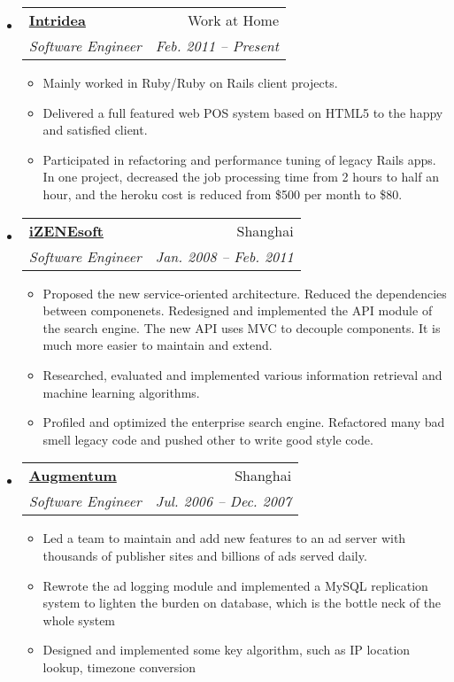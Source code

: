 \documentclass[letterpaper,11pt]{article}
\makeatletter
\newcommand{\resitem}[1]{\item #1 \vspace{-2pt}}
\newcommand{\ressubheading}[4]{
\begin{tabular*}{6.5in}{l@{\extracolsep{\fill}}r}
  \textbf{#1} & #2 \\
  \textit{#3} & \textit{#4} \\
\end{tabular*}\vspace{-6pt}}
\makeatother
\begin{document}
\begin{itemize}
\item
  \ressubheading{\href{http://www.intridea.com}{Intridea}}{Work at Home}{%
    Software Engineer}{Feb. 2011 -- Present}

  { \footnotesize
    \begin{itemize}
      \resitem{Mainly worked in Ruby/Ruby on Rails client projects.}

      \resitem{Delivered a full featured web POS system based on HTML5 to the
        happy and satisfied client.}

      \resitem{Participated in refactoring and performance tuning of legacy
        Rails apps. In one project, decreased the job processing time from 2 hours to half an hour, and the heroku cost is
        reduced from \$500 per month to \$80.}
    \end{itemize}
  }

\item
  \ressubheading{\href{http://www.izenesoft.com/EN/home.html}{iZENEsoft}}{Shanghai}{%
    Software Engineer}{Jan. 2008 -- Feb. 2011}

  { \footnotesize
    \begin{itemize}
      \resitem{Proposed the new service-oriented architecture. Reduced the
        dependencies between componenets. Redesigned and implemented the API
        module of the search engine. The new API uses MVC to decouple
        components. It is much more easier to maintain and extend.}

      \resitem{Researched, evaluated and implemented various information
        retrieval and machine learning algorithms.}

      \resitem{Profiled and optimized the enterprise search engine. Refactored
        many bad smell legacy code and pushed other to write good style code.}

    \end{itemize}
  }

\item \ressubheading{\href{http://www.augmentum.com/}{Augmentum}}{Shanghai}{%
      Software Engineer}{Jul. 2006 -- Dec. 2007}

  { \footnotesize
    \begin{itemize}
      \resitem{Led a team to maintain and add new features to an ad server with
        thousands of publisher sites and billions of ads served
        daily.}
      
      \resitem{Rewrote the ad logging module and implemented a MySQL replication
        system to lighten the burden on database, which is the bottle neck of
        the whole system}
      
      \resitem{Designed and implemented some key algorithm, such as IP location
        lookup, timezone conversion}

    \end{itemize}
  }
\end{itemize}
\end{document}

